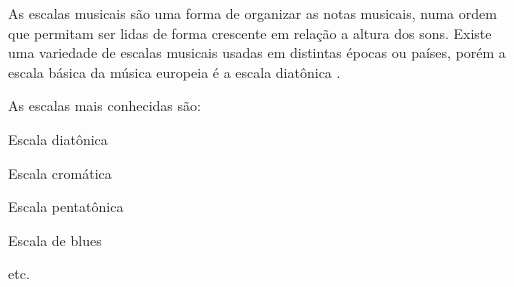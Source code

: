 \label{sec:pos:Escala}
As escalas musicais são uma forma de organizar as notas musicais, 
numa ordem que permitam ser lidas de forma crescente em relação a altura dos sons.
Existe uma variedade de escalas musicais usadas em distintas épocas ou países, 
porém a escala básica da música europeia é a escala diatônica \cite[pp. 753]{apel1969harvard}.
\begin{example}As escalas mais conhecidas são:
\begin{inparaitem}
\item Escala diatônica
\item Escala cromática
\item Escala pentatônica
\item Escala de blues
\item etc.
\end{inparaitem}
\end{example}

